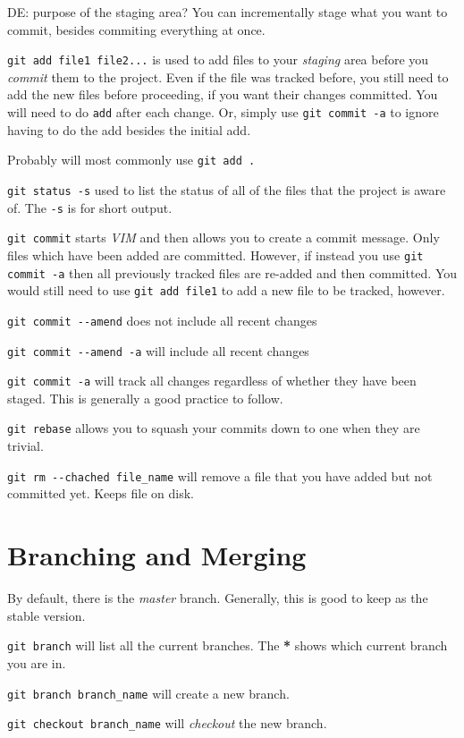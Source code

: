 \documentclass[iop,floatfix]{emulateapj}
\begin{document}
DE: purpose of the staging area? You can incrementally stage what you want to commit, besides commiting everything at once.

\verb|git add file1 file2...| is used to add files to your \emph{staging} area
before you \emph{commit} them to the project. Even if the file was tracked
before, you still need to add the new files before proceeding, if you want
their changes committed. You will need to do \verb|add| after each change. Or, simply use \verb|git commit -a| to ignore having to do the add besides the initial add.

Probably will most commonly use \verb|git add .| 

\verb|git status -s| used to list the status of all of the files that the
project is aware of. The \verb|-s| is for short output.

\verb|git commit| starts \emph{VIM} and then allows you to create a commit
message. Only files which have been added are committed. However, if instead
you use \verb|git commit -a| then all previously tracked files are re-added and
then committed. You would still need to use \verb|git add file1| to add a new
file to be tracked, however.

\verb|git commit --amend| does not include all recent changes

\verb|git commit --amend -a| will include all recent changes

\verb|git commit -a| will track all changes regardless of whether they have been staged. This is generally a good practice to follow.

\verb|git rebase| allows you to squash your commits down to one when they are trivial.

\verb|git rm --chached file_name| will remove a file that you have added but not committed yet. Keeps file on disk.

\section{Branching and Merging}

By default, there is the \emph{master} branch. Generally, this is good to keep as the stable version.

\verb|git branch| will list all the current branches. The \textbf{*} shows which current branch you are in.

\verb|git branch branch_name| will create a new branch.

\verb|git checkout branch_name| will \emph{checkout} the new branch.
\end{document}
